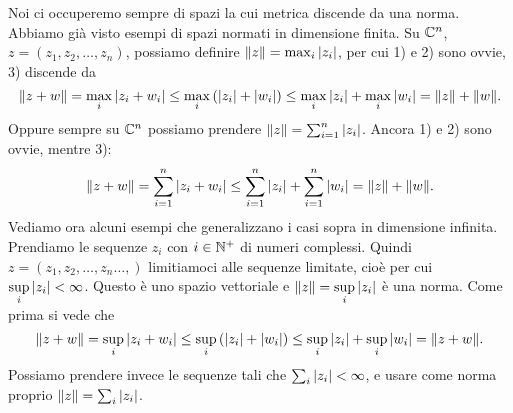 Noi ci occuperemo sempre di spazi la cui metrica discende da una norma.
Abbiamo già visto esempi di spazi normati in dimensione finita. Su $\mathbb C^n$,
$z = \left( z_1, z_2, \ldots, z_n \right)$, possiamo definire
$\|z\| = \max_i {\left|z_i\right|}$, per cui 1) e 2) sono ovvie, 3) discende da \[
\|z + w\| = \max_i {\left|z_i + w_i\right|} \leq \max_i \left({\left|z_i\right|} + {\left|w_i\right|}\right)
\leq \max_i {\left|z_i\right|} + \max_i {\left|w_i\right|} = \|z\| + \|w\|
.\] 
Oppure sempre su $\mathbb C^n$ possiamo prendere $\|z\| = \sum_{i=1}^{n} {\left|z_i\right|}$.
Ancora 1) e 2) sono ovvie, mentre 3):
\[
	\|z + w\| = \sum_{i=1}^{n} {\left|z_i + w_i\right|} \leq \sum_{i=1}^{n} {\left|z_i\right|} +
	\sum_{i=1}^{n} {\left|w_i\right|} = \|z\| + \|w\|
.\] 
Vediamo ora alcuni esempi che generalizzano i casi sopra in dimensione
infinita. Prendiamo le sequenze $z_i$ con $i \in \mathbb N^+$ di numeri complessi.
Quindi $z = \left( z_1, z_2, \ldots, z_n \ldots,  \right)$ limitiamoci alle
sequenze limitate, cioè per cui $\displaystyle \sup_i {\left|z_i\right|} < \infty$. Questo è uno
spazio vettoriale e $\|z\| = \displaystyle \sup_i {\left|z_i\right|}$ è una norma.
Come prima si vede che
\[
	\|z + w \| = \sup_i {\left|z_i + w_i\right|} \leq \sup_i \left({\left|z_i\right|} + {\left|w_i\right|}
	\right) \leq \sup_i {\left|z_i\right|} + \sup_i {\left|w_i\right|} = \| z + w\| 
.\] 
Possiamo prendere invece le sequenze tali che 
$\sum_i {\left|z_i\right|} < \infty$, e usare come norma proprio 
$\|z\| = \sum_{i} {\left|z_i\right|}$. 

